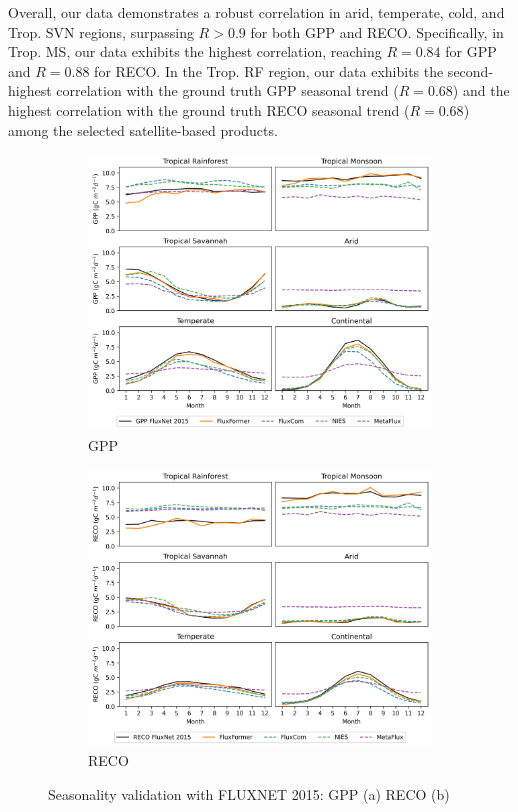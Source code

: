 Overall, our data demonstrates a robust correlation in arid, temperate, cold, and Trop. SVN regions, surpassing $R> 0.9$ for both GPP and RECO. Specifically, in Trop. MS, our data exhibits the highest correlation, reaching $R=0.84$ for GPP and $R=0.88$ for RECO. In the Trop. RF region, our data exhibits the second-highest correlation with the ground truth GPP seasonal trend ($R=0.68$) and the highest correlation with the ground truth RECO seasonal trend ($R=0.68$) among the selected satellite-based products. \par
\begin{figure}[p]
    \centering
    \begin{subfigure}{\textwidth}
      \centering
      \includegraphics[width=.8\textwidth]{figs/chap6/seasonal_fluxnet_GPP.png}
      \caption{GPP}
      \label{fig:chap6_fig4a}
    \end{subfigure}

    \begin{subfigure}{\textwidth}
      \centering
      \includegraphics[width=.8\textwidth]{figs/chap6/seasonal_fluxnet_RECO.png}
      \caption{RECO}
      \label{fig:chap6_fig4b}
    \end{subfigure}
    \caption[Seasonality validation with FLUXNET 2015]{Seasonality validation with FLUXNET 2015: GPP (a) RECO (b)}
    \label{fig:chap6_fig4}
\end{figure}

